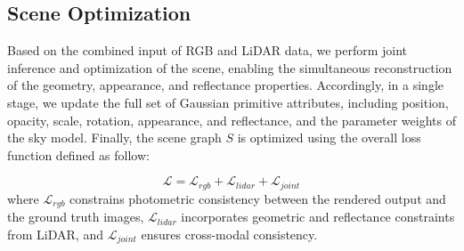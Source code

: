 \documentclass[letterpaper, 10 pt, conference]{ieeeconf}  %
\begin{document}
\subsection{Scene Optimization}

Based on the combined input of RGB and LiDAR data, we perform joint inference and optimization of the scene, enabling the simultaneous reconstruction of the geometry, appearance, and reflectance properties. Accordingly, in a single stage, we update the full set of Gaussian primitive attributes, including position, opacity, scale, rotation, appearance, and reflectance, and the parameter weights of the sky model. Finally, the scene graph $S$ is optimized using the overall loss function defined as follow:

\begin{equation}
	\label{eq11}
\mathcal{L}= \mathcal{L}_{rgb} + \mathcal{L}_{lidar} + \mathcal{L}_{joint}
\end{equation}
where $\mathcal{L}_{rgb}$ constrains photometric consistency between the rendered output and the ground truth images, $\mathcal{L}_{lidar}$ incorporates geometric and reflectance constraints from LiDAR, and $\mathcal{L}_{joint}$ ensures cross-modal consistency.
\end{document}
